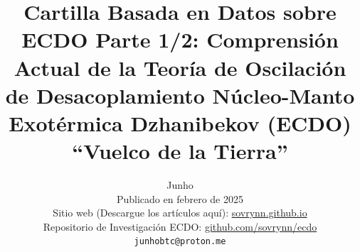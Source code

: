 \documentclass[10pt,twocolumn,letterpaper]{article}
\begin{document}
\title{Cartilla Basada en Datos sobre ECDO Parte 1/2: Comprensión Actual de la Teoría de Oscilación de Desacoplamiento Núcleo-Manto Exotérmica Dzhanibekov (ECDO) “Vuelco de la Tierra”}

\author{Junho\\
Publicado en febrero de 2025\\
Sitio web (Descargue los artículos aquí): \href{https://sovrynn.github.io}{sovrynn.github.io}\\
Repositorio de Investigación ECDO: \href{https://github.com/sovrynn/ecdo}{github.com/sovrynn/ecdo}\\
{\tt\small junhobtc@proton.me}
}

\maketitle
\end{document}
